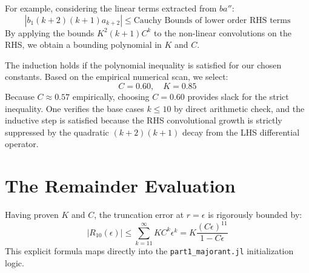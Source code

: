 \documentclass[12pt]{article}
\begin{document}
For example, considering the linear terms extracted from $b a''$:
\[ |b_1 (k+2)(k+1) a_{k+2}| \le \text{Cauchy Bounds of lower order RHS terms} \]
By applying the bounds $K^2(k+1)C^k$ to the non-linear convolutions on the RHS, we obtain a bounding polynomial in $K$ and $C$. 

The induction holds if the polynomial inequality is satisfied for our chosen constants. Based on the empirical numerical scan, we select:
\[ C = 0.60, \quad K = 0.85 \]
Because $C \approx 0.57$ empirically, choosing $C=0.60$ provides slack for the strict inequality. One verifies the base cases $k \le 10$ by direct arithmetic check, and the inductive step is satisfied because the RHS convolutional growth is strictly suppressed by the quadratic $(k+2)(k+1)$ decay from the LHS differential operator.

\section{The Remainder Evaluation}
Having proven $K$ and $C$, the truncation error at $r=\epsilon$ is rigorously bounded by:
\[ |R_{10}(\epsilon)| \le \sum_{k=11}^\infty K C^k \epsilon^k = K \frac{(C \epsilon)^{11}}{1 - C \epsilon} \]
This explicit formula maps directly into the \texttt{part1\_majorant.jl} initialization logic.
\end{document}
